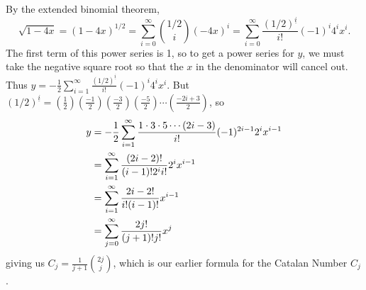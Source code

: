 \documentclass{book}
\begin{document}
\begin{activity}[]
\begin{enumerate}[font=\bfseries,label=(\alph*),ref=\alph*]
\hypertarget{p-1456}{}%
By the extended binomial theorem,%
\begin{equation*}
\sqrt{1-4x}=(1-4x)^{1/2} = \sum_{i=0}^\infty \binom{1/2}{i}(-4x)^i=
\sum_{i=0}^\infty \frac{(1/2)^{\underline{i}}}{i!}(-1)^i4^ix^i\text{.}
\end{equation*}
The first term of this power series is 1, so to get a power series for \(y\), we must take the negative square root so that the \(x\) in the denominator will cancel out. Thus \(y=-\frac{1}{2}\sum_{i=1}^\infty \frac{(1/2)^{\underline{i}}}{i!}(-1)^i4^ix^i\). But \((1/2)^{\underline{i}}=(\frac{1}{2})(\frac{-1}{2})(\frac{-3}{2})(\frac{-5}{2})\cdots (\frac{-2i+3}{2})\), so%
\begin{align*}
y &= -\frac{1}{2}\sum_{i=1}^\infty\frac{1\cdot3\cdot5\cdots(2i-3)}{i!}(-1)^{2i-1}2^ix^{i-1}\\
&=  \sum_{i=1}^\infty \frac{(2i-2)!}{(i-1)!2^{i}i!}2^ix^{i-1}\\
&=  \sum_{i=1}^\infty\frac{2i-2!}{i!(i-1)!}x^{i-1}\\
&= \sum_{j=0}^\infty\frac{2j!}{(j+1)!j!}x^j
\end{align*}
giving us \(C_j=\frac{1}{j+1}\binom{2j}{j}\), which is our earlier formula for the Catalan Number \(C_j\).%
\end{enumerate}
\end{activity}
\end{document}
